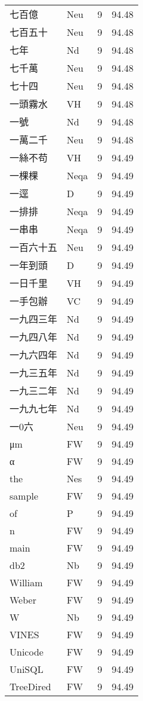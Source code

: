 \documentclass[twocolumn]{book}
\begin{document}
\begin{supertabular}{llrr}
七百億 & Neu & 9 &  94.48\\
七百五十 & Neu & 9 &  94.48\\
七年 & Nd & 9 &  94.48\\
七千萬 & Neu & 9 &  94.48\\
七十四 & Neu & 9 &  94.48\\
一頭霧水 & VH & 9 &  94.48\\
一號 & Nd & 9 &  94.48\\
一萬二千 & Neu & 9 &  94.48\\
一絲不苟 & VH & 9 &  94.49\\
一棵棵 & Neqa & 9 &  94.49\\
一逕 & D & 9 &  94.49\\
一排排 & Neqa & 9 &  94.49\\
一串串 & Neqa & 9 &  94.49\\
一百六十五 & Neu & 9 &  94.49\\
一年到頭 & D & 9 &  94.49\\
一日千里 & VH & 9 &  94.49\\
一手包辦 & VC & 9 &  94.49\\
一九四三年 & Nd & 9 &  94.49\\
一九四八年 & Nd & 9 &  94.49\\
一九六四年 & Nd & 9 &  94.49\\
一九三五年 & Nd & 9 &  94.49\\
一九三二年 & Nd & 9 &  94.49\\
一九九七年 & Nd & 9 &  94.49\\
一0六 & Neu & 9 &  94.49\\
μm & FW & 9 &  94.49\\
α & FW & 9 &  94.49\\
the & Nes & 9 &  94.49\\
sample & FW & 9 &  94.49\\
of & P & 9 &  94.49\\
n & FW & 9 &  94.49\\
main & FW & 9 &  94.49\\
db2 & Nb & 9 &  94.49\\
William & FW & 9 &  94.49\\
Weber & FW & 9 &  94.49\\
W & Nb & 9 &  94.49\\
VINES & FW & 9 &  94.49\\
Unicode & FW & 9 &  94.49\\
UniSQL & FW & 9 &  94.49\\
TreeDired & FW & 9 &  94.49\\

\end{supertabular}
\end{document}
